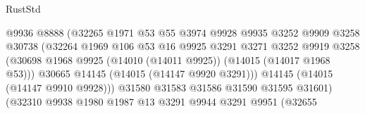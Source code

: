 \begin{lexlean}{RustStd}
\begin{coremodule}
                                          @9936
                                          @8888
                                          (@32265
                                            @1971
                                            @53
                                            @55
                                            @3974
                                            @9928
                                            @9935
                                            @3252
                                            @9909
                                            @3258
                                            @30738
                                            (@32264
                                              @1969
                                              @106
                                              @53
                                              @16
                                              @9925
                                              @3291
                                              @3271
                                              @3252
                                              @9919
                                              @3258
                                              (@30698
                                                @1968
                                                @9925
                                                (@14010 (@14011 @9925))
                                                (@14015 (@14017 @1968 @53)))
                                              @30665
                                              @14145
                                              (@14015 (@14147 @9920 @3291)))
                                            @14145
                                            (@14015 (@14147 @9910 @9928)))
                                          @31580
                                          @31583
                                          @31586
                                          @31590
                                          @31595
                                          @31601)
                                        (@32310
                                          @9938
                                          @1980
                                          @1987
                                          @13
                                          @3291
                                          @9944
                                          @3291
                                          @9951
                                          (@32655

\end{coremodule}
\end{lexlean}
